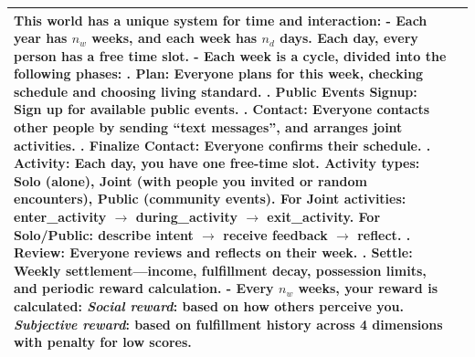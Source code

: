 \begin{table}[h]
\begin{tabular}{p{0.8in}p{4.3in}}
This world has a unique system for time and interaction:
\newline - Each year has $n_w$ weeks, and each week has $n_d$ days. Each day, every person has a free time slot.
\newline - Each week is a cycle, divided into the following phases:
\vspace{3pt}\newline
\quad 1. \textbf{Plan}: Everyone plans for this week, checking schedule and choosing living standard.
\newline \quad 2. \textbf{Public Events Signup}: Sign up for available public events.
\newline \quad 3. \textbf{Contact}: Everyone contacts other people by sending ``text messages'', and arranges joint activities.
\newline \quad 4. \textbf{Finalize Contact}: Everyone confirms their schedule.
\newline \quad 5. \textbf{Activity}: Each day, you have one free-time slot. Activity types: Solo (alone), Joint (with people you invited or random encounters), Public (community events).
\newline \quad\quad For Joint activities: enter\_activity $\to$ during\_activity $\to$ exit\_activity.
\newline \quad\quad For Solo/Public: describe intent $\to$ receive feedback $\to$ reflect.
\newline \quad 6. \textbf{Review}: Everyone reviews and reflects on their week.
\newline \quad 7. \textbf{Settle}: Weekly settlement---income, fulfillment decay, possession limits, and periodic reward calculation.
\vspace{4pt}\newline
- Every $n_w$ weeks, your \textbf{reward} is calculated:
\newline \quad \emph{Social reward}: based on how others perceive you.
\newline \quad \emph{Subjective reward}: based on fulfillment history across 4 dimensions with penalty for low scores.

\\
\bottomrule
\end{tabular}
\end{table}



